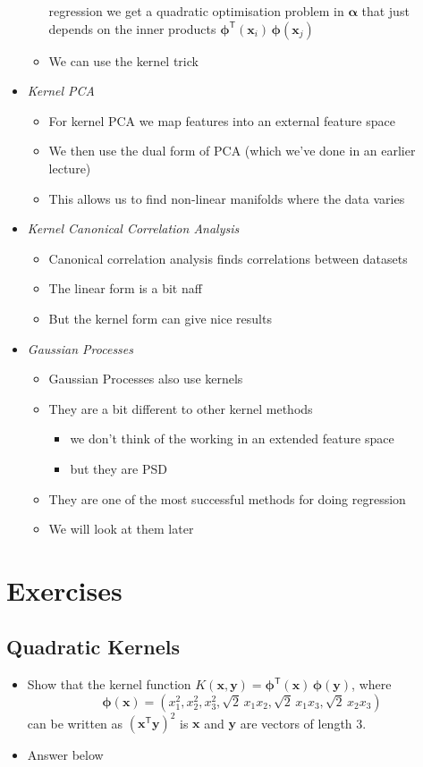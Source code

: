 \documentclass[11pt]{article}
\newcommand{\tr}{\textsf{T}}
\begin{document}
\begin{itemize}
\begin{itemize}
regression we get a quadratic optimisation problem in
\(\bm{\alpha}\) that just depends on the inner products
\(\bm{\phi}^\tr(\bm{x}_i)\,\bm{\phi}(\bm{x}_j)\)
\item We can use the kernel trick
\end{itemize}
\item \emph{Kernel PCA}
\begin{itemize}
\item For kernel PCA we map features into an external feature space
\item We then use the dual form of PCA (which we've done in an
earlier lecture)
\item This allows us to find non-linear manifolds where the data varies
\end{itemize}
\item \emph{Kernel Canonical Correlation Analysis}
\begin{itemize}
\item Canonical correlation analysis finds correlations between datasets
\item The linear form is a bit naff
\item But the kernel form can give nice results
\end{itemize}
\item \emph{Gaussian Processes}
\begin{itemize}
\item Gaussian Processes also use kernels
\item They are a bit different to other kernel methods
\begin{itemize}
\item we don't think of the working in an extended feature space
\item but they are PSD
\end{itemize}
\item They are one of the most successful methods for doing
regression
\item We will look at them later
\end{itemize}
\end{itemize}

\section{Exercises}
\label{sec:orgc59c199}

\subsection{Quadratic Kernels}
\label{sec:orga51f350}
\begin{itemize}
\item Show that the kernel function \(K(\bm{x},\bm{y}) =
      \bm{\phi}^\tr(\bm{x}) \,\bm{\phi}(\bm{y})\), where
$$ \bm{\phi}(\bm{x}) = (x_1^2, x_2^2, x_3^2, \sqrt{2}\, x_1 x_2,
      \sqrt{2}\,x_1x_3, \sqrt{2}\,x_2x_3) $$
 can be written as
 \((\bm{x}^\tr\bm{y})^2\) is \(\bm{x}\) and \(\bm{y}\) are vectors of
 length 3.
\item Answer below
\end{itemize}
\end{document}
